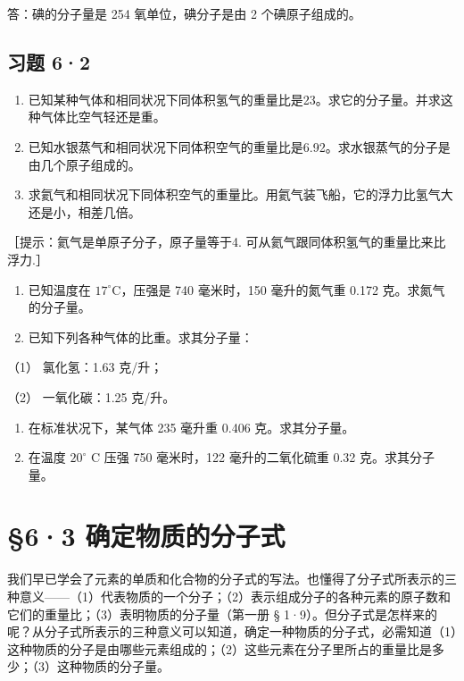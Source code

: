 答：碘的分子量是 254 氧单位，碘分子是由 2 个碘原子组成的。

\subsection{习题 6·2}

\begin{enumerate}
\item
  已知某种气体和相同状况下同体积氢气的重量比是23。求它的分子量。并求这种气体比空气轻还是重。
\item
  已知水银蒸气和相同状况下同体积空气的重量比是6.92。求水银蒸气的分子是由几个原子组成的。
\item
  求氦气和相同状况下同体积空气的重量比。用氦气装飞船，它的浮力比氢气大还是小，相差几倍。
\end{enumerate}

［提示：氦气是单原子分子，原子量等于4.
可从氦气跟同体积氢气的重量比来比浮力.］

\begin{enumerate}[start=4]
\item
  已知温度在 \(17^{\circ} \mathrm{C}\)，压强是 740 毫米时，150
  毫升的氮气重 0.172 克。求氮气的分子量。
\item
  已知下列各种气体的比重。求其分子量：
\end{enumerate}

（1） 氯化氢：1.63 克/升；

（2） 一氧化碳：1.25 克/升。

\begin{enumerate}[start=6]
\item
  在标准状况下，某气体 235 毫升重 0.406 克。求其分子量。
\item
  在温度 \(20^{\circ}\) C 压强 750 毫米时，122 毫升的二氧化硫重 0.32
  克。求其分子量。
\end{enumerate}

\section{§6·3 确定物质的分子式}

我们早已学会了元素的单质和化合物的分子式的写法。也懂得了分子式所表示的三种意义------（1）代表物质的一个分子；（2）表示组成分子的各种元素的原子数和它们的重量比；（3）表明物质的分子量（第一册
§
1·9）。但分子式是怎样来的呢？从分子式所表示的三种意义可以知道，确定一种物质的分子式，必需知道（1）这种物质的分子是由哪些元素组成的；（2）这些元素在分子里所占的重量比是多少；（3）这种物质的分子量。


